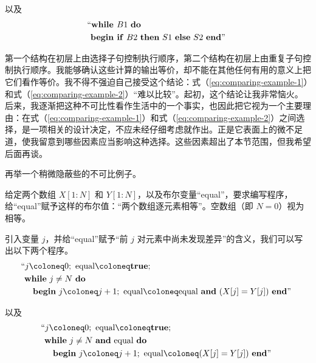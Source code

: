 \noindent
以及
\begin{equation}
	\label{eq:comparing-example-2}
	\begin{split}
		&\text{\hspace{-.4em}``\textbf{while }} B1\text{ \textbf{do}}\\
		&\text{\textbf{begin if} } B2\text{ \textbf{then} } S1\text{ \textbf{else} } S2\text{ \textbf{end}''}
	\end{split}
\end{equation}

\label{pg:dilema}
第一个结构在初层上由选择子句控制执行顺序，第二个结构在初层上由重复子句控制执行顺序。我能够确认这些计算的输出等价，却不能在其他任何有用的意义上把它们看作等价。我不得不强迫自己接受这个结论：式（\ref{eq:comparing-example-1}）和式（\ref{eq:comparing-example-2}）“难以比较”。起初，这个结论让我非常恼火。后来，我逐渐把这种不可比性看作生活中的一个事实，也因此把它视为一个主要理由：在式（\ref{eq:comparing-example-1}）和式（\ref{eq:comparing-example-2}）之间选择，是一项相关的设计决定，不应未经仔细考虑就作出。正是它表面上的微不足道，使我留意到哪些因素应当影响这种选择。这些因素超出了本节范围，但我希望后面再谈。

再举一个稍微隐蔽些的不可比例子。

给定两个数组 $X[1:N]$ 和 $Y[1:N]$，以及布尔变量“equal”，要求编写程序，给“equal”赋予这样的布尔值：“两个数组逐元素相等”。空数组（即 $N = 0$）视为相等。

引入变量 $j$，并给“equal”赋予“前 $j$ 对元素中尚未发现差异”的含义，我们可以写出以下两个程序。
\begin{equation}
	\label{eq:comparing-example-3}
	\begin{split}
		&\text{\hspace{-.4em}``}j \coloneq 0;\text{ equal} \coloneq \text{\textbf{true}};\\
		&\text{\textbf{while} } j \neq N\text{ \textbf{do}}\\
		&\quad\text{\textbf{begin} } j \coloneq  j + 1;\text{ equal} \coloneq \text{equal \textbf{and} } (X[j] = Y[j]) \text{ \textbf{end}''}
	\end{split}
\end{equation}

\noindent
以及
\begin{equation}
	\label{eq:comparing-example-4}
	\begin{split}
		&\text{\hspace{-.4em}``}j \coloneq 0;\text{ equal} \coloneq \text{\textbf{true}};\\
		&\text{\textbf{while} } j \neq N\text{ \textbf{and} equal \textbf{do}}\\
		&\quad\text{\textbf{begin} } j \coloneq  j + 1;\text{ equal} \coloneq (X[j] = Y[j]) \text{ \textbf{end}''}
	\end{split}
\end{equation}

